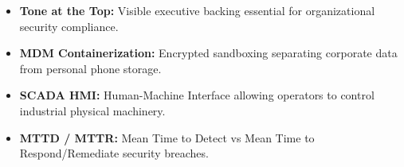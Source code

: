 \documentclass[12pt,a4paper]{article}
\begin{document}
\begin{tcolorbox}[defbox, title={\textbf{One-Line Definitions}}]
\begin{itemize}[leftmargin=*, itemsep=2pt, topsep=0pt]
  \item \textbf{Tone at the Top:} Visible executive backing essential for organizational security compliance.
  \item \textbf{MDM Containerization:} Encrypted sandboxing separating corporate data from personal phone storage.
  \item \textbf{SCADA HMI:} Human-Machine Interface allowing operators to control industrial physical machinery.
  \item \textbf{MTTD / MTTR:} Mean Time to Detect vs Mean Time to Respond/Remediate security breaches.
\end{itemize}
\end{tcolorbox}
\end{document}
